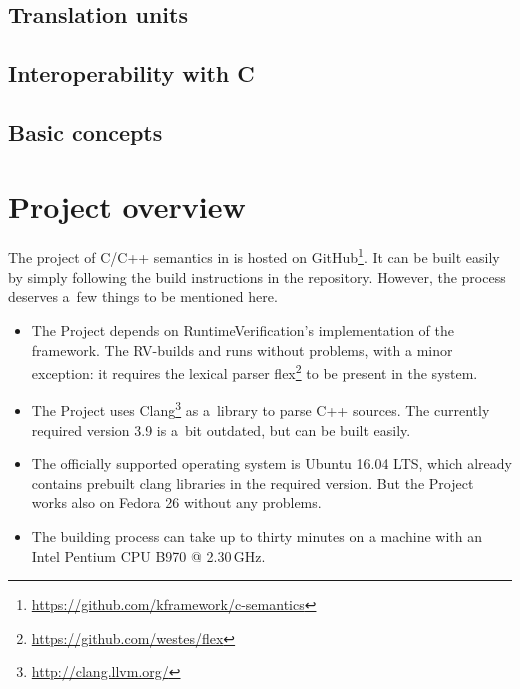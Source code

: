 \documentclass[nolot,nolof,nocover,printed]{fithesis3}
\begin{document}
\section{Translation units}

\section{Interoperability with C}

\section{Basic concepts}


\fi %

\chapter{Project overview}

The project of C/C++ semantics in \K is hosted on GitHub\footnote{\url{https://github.com/kframework/c-semantics}}. It can be built easily by simply following the build instructions in the repository. However, the process deserves a~few things to be mentioned here.

\begin{itemize}
\item The Project depends on RuntimeVerification's implementation of the \K framework. The RV-\K builds and runs without problems, with a minor exception: it requires the lexical parser flex\footnote{\url{https://github.com/westes/flex}} to be present in the system.
\item The Project uses Clang\footnote{\url{http://clang.llvm.org/}} as a~library to parse C++ sources. The currently required version 3.9 is a~bit outdated, but can be built easily.
\item The officially supported operating system is Ubuntu 16.04 LTS, which already contains prebuilt clang libraries in the required version. But the Project works also on Fedora 26 without any problems.
\item The building process can take up to thirty minutes on a machine with an Intel Pentium CPU B970 @ 2.30\,GHz.
\end{itemize}
\end{document}
